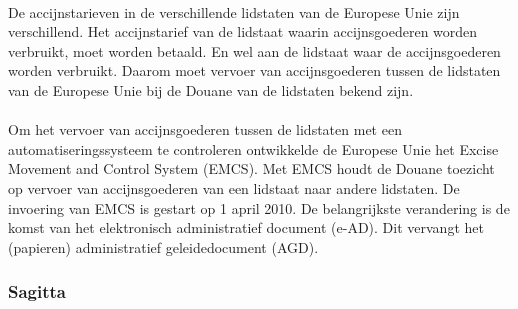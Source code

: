 \paragraph {}De accijnstarieven in de verschillende lidstaten van de Europese Unie zijn
verschillend. Het accijnstarief van de lidstaat waarin accijnsgoederen worden verbruikt,
moet worden betaald. En wel aan de lidstaat waar de accijnsgoederen worden verbruikt.
Daarom moet vervoer van accijnsgoederen tussen de lidstaten van de Europese Unie bij de
Douane van de lidstaten bekend zijn.

\paragraph {} Om het vervoer van accijnsgoederen tussen de lidstaten met een
automatiseringssysteem te controleren ontwikkelde de Europese Unie het Excise Movement and
Control System (EMCS).  Met EMCS houdt de Douane toezicht op vervoer van accijnsgoederen
van een lidstaat naar andere lidstaten. De invoering van EMCS is gestart op 1 april 2010.
De belangrijkste verandering is de komst van het elektronisch administratief document
(e-AD). Dit vervangt het (papieren) administratief geleidedocument (AGD).


\subsubsection {Sagitta}

